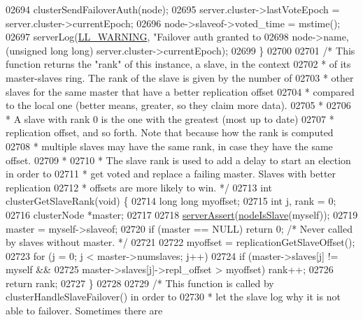 \begin{DoxyCode}
{{{{{{{{{{{{{{{{{{{{{{{{{{{{{{{{{{{{{{{{{{{{{{{{{02694     clusterSendFailoverAuth(node);
02695     server.cluster->lastVoteEpoch = server.cluster->currentEpoch;
02696     node->slaveof->voted\_time = mstime();
02697     serverLog(\hyperlink{server_8h_a31229b9334bba7d6be2a72970967a14b}{LL\_WARNING}, \textcolor{stringliteral}{"Failover auth granted to %
02698         node->name, (\textcolor{keywordtype}{unsigned} \textcolor{keywordtype}{long} \textcolor{keywordtype}{long}) server.cluster->currentEpoch);
02699 \}
02700 
02701 \textcolor{comment}{/* This function returns the "rank" of this instance, a slave, in the context}
02702 \textcolor{comment}{ * of its master-slaves ring. The rank of the slave is given by the number of}
02703 \textcolor{comment}{ * other slaves for the same master that have a better replication offset}
02704 \textcolor{comment}{ * compared to the local one (better means, greater, so they claim more data).}
02705 \textcolor{comment}{ *}
02706 \textcolor{comment}{ * A slave with rank 0 is the one with the greatest (most up to date)}
02707 \textcolor{comment}{ * replication offset, and so forth. Note that because how the rank is computed}
02708 \textcolor{comment}{ * multiple slaves may have the same rank, in case they have the same offset.}
02709 \textcolor{comment}{ *}
02710 \textcolor{comment}{ * The slave rank is used to add a delay to start an election in order to}
02711 \textcolor{comment}{ * get voted and replace a failing master. Slaves with better replication}
02712 \textcolor{comment}{ * offsets are more likely to win. */}
02713 \textcolor{keywordtype}{int} clusterGetSlaveRank(\textcolor{keywordtype}{void}) \{
02714     \textcolor{keywordtype}{long} \textcolor{keywordtype}{long} myoffset;
02715     \textcolor{keywordtype}{int} j, rank = 0;
02716     clusterNode *master;
02717 
02718     \hyperlink{server_8h_a88114b5169b4c382df6b56506285e56a}{serverAssert}(\hyperlink{cluster_8h_a3c99881f6892130c902b42b1f84a0e11}{nodeIsSlave}(myself));
02719     master = myself->slaveof;
02720     \textcolor{keywordflow}{if} (master == NULL) \textcolor{keywordflow}{return} 0; \textcolor{comment}{/* Never called by slaves without master. */}
02721 
02722     myoffset = replicationGetSlaveOffset();
02723     \textcolor{keywordflow}{for} (j = 0; j < master->numslaves; j++)
02724         \textcolor{keywordflow}{if} (master->slaves[j] != myself &&
02725             master->slaves[j]->repl\_offset > myoffset) rank++;
02726     \textcolor{keywordflow}{return} rank;
02727 \}
02728 
02729 \textcolor{comment}{/* This function is called by clusterHandleSlaveFailover() in order to}
02730 \textcolor{comment}{ * let the slave log why it is not able to failover. Sometimes there are}
}}}}}}}}}}}}}}}}}}}}}}}}}}}}}}}}}}}}}}}}}}}}}}}}}}
\end{DoxyCode}
